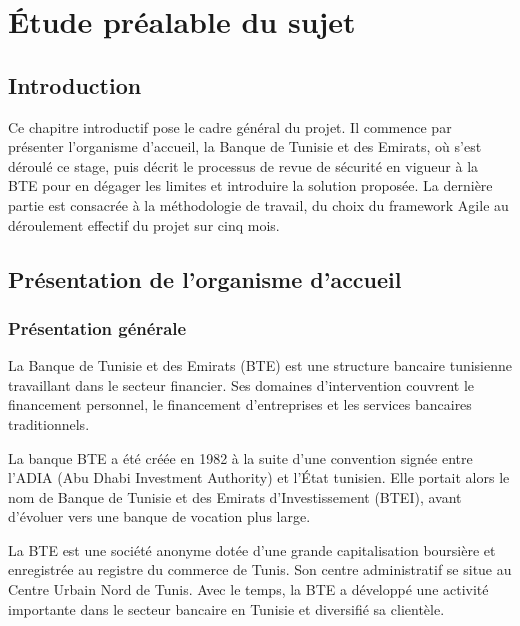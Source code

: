 \chapter{Étude préalable du sujet}

\section*{Introduction}

Ce chapitre introductif pose le cadre général du projet. Il commence par présenter
l'organisme d'accueil, la Banque de Tunisie et des Emirats, où s'est déroulé ce stage,
puis décrit le processus de revue de sécurité en vigueur à la BTE pour en dégager les
limites et introduire la solution proposée. La dernière partie est consacrée à la
méthodologie de travail, du choix du framework Agile au déroulement effectif du projet
sur cinq mois.

\section{Présentation de l'organisme d'accueil}

    \subsection{Présentation générale}

        La Banque de Tunisie et des Emirats (BTE) \cite{BTE} est une structure bancaire
        tunisienne travaillant dans le secteur financier. Ses domaines d'intervention
        couvrent le financement personnel, le financement d'entreprises et les services
        bancaires traditionnels.

        La banque BTE a été créée en 1982 à la suite d'une convention signée entre
        l'ADIA (Abu Dhabi Investment Authority) et l'État tunisien. Elle portait alors
        le nom de Banque de Tunisie et des Emirats d'Investissement (BTEI), avant
        d'évoluer vers une banque de vocation plus large.

        La BTE est une société anonyme dotée d'une grande capitalisation boursière et
        enregistrée au registre du commerce de Tunis. Son centre administratif se situe
        au Centre Urbain Nord de Tunis. Avec le temps, la BTE a développé une activité
        importante dans le secteur bancaire en Tunisie et diversifié sa clientèle.

